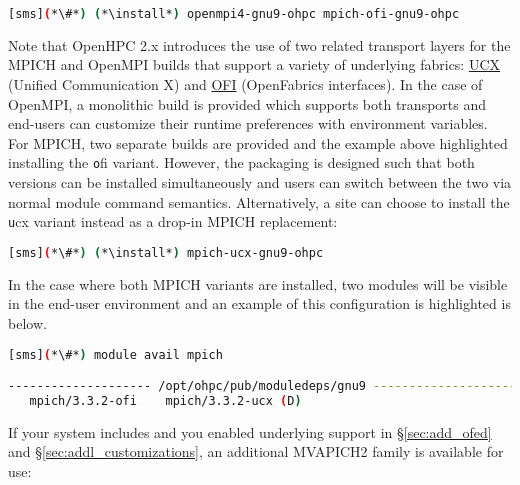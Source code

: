 \fi

\begin{lstlisting}[language=bash]
[sms](*\#*) (*\install*) openmpi4-gnu9-ohpc mpich-ofi-gnu9-ohpc
\end{lstlisting}

Note that OpenHPC 2.x introduces the use of two related transport layers for
the MPICH and OpenMPI builds that support a variety of underlying
fabrics: \href{https://www.openucx.org}{UCX} (Unified Communication X)
and \href{https://ofiwg.github.io/libfabric/}{OFI} (OpenFabrics interfaces).
In the case of OpenMPI, a monolithic build is provided which supports both
transports and end-users can customize their runtime preferences with
environment variables. For MPICH, two separate builds are provided and the
example above highlighted installing the {\texttt ofi} variant.  However, the
packaging is designed such that both versions can be installed simultaneously
and users can switch between the two via normal module command
semantics. Alternatively, a site can choose to install the {\texttt ucx} variant
instead as a drop-in MPICH replacement:

\begin{lstlisting}[language=bash]
[sms](*\#*) (*\install*) mpich-ucx-gnu9-ohpc
\end{lstlisting}

In the case where both MPICH variants are installed, two modules will be
visible in the end-user environment and an example of this configuration is
highlighted is below. 

\begin{lstlisting}[language=bash]
[sms](*\#*) module avail mpich

-------------------- /opt/ohpc/pub/moduledeps/gnu9 ---------------------
   mpich/3.3.2-ofi    mpich/3.3.2-ucx (D)
\end{lstlisting}

If your system includes \InfiniBand{} and you enabled underlying support in
\S\ref{sec:add_ofed} and \S\ref{sec:addl_customizations}, an additional
MVAPICH2 family is available for use:

